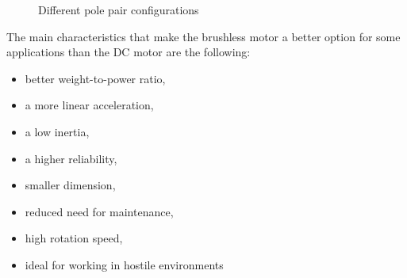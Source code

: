 \begin{figure}[htbp]
	\centering
    \hfill
    \hfill
    \caption{Different pole pair configurations}
    \label{fig:pole_pairs}
\end{figure}

The main characteristics that make the brushless motor a better option for some applications than the \ac{DC} motor are the following:

\begin{itemize}
	\item better weight-to-power ratio,
	\item a more linear acceleration,
	\item a low inertia,
	\item a higher reliability,
	\item smaller dimension,
	\item reduced need for maintenance,
	\item high rotation speed,
	\item ideal for working in hostile environments
\end{itemize}

